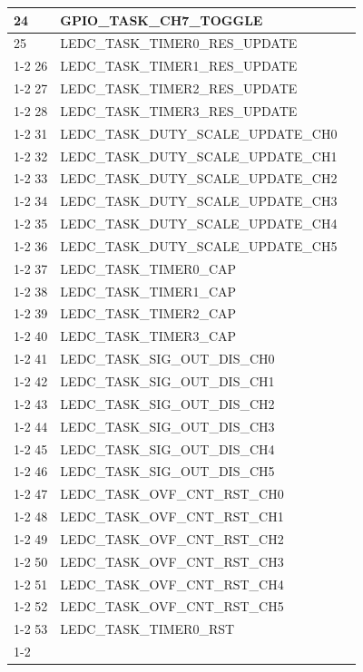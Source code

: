 \documentclass[main\_\_CN.tex]{subfiles}
\begin{document}
\begin{longtable}{ | l | l | l | }
24  & GPIO\_TASK\_CH7\_TOGGLE  &  \\ \hline
25  & LEDC\_TASK\_TIMER0\_RES\_UPDATE      & \nameref{mod:ledpwm} \\ \cline{1-2}
26  & LEDC\_TASK\_TIMER1\_RES\_UPDATE      & \\ \cline{1-2}
27  & LEDC\_TASK\_TIMER2\_RES\_UPDATE      & \\ \cline{1-2}
28  & LEDC\_TASK\_TIMER3\_RES\_UPDATE      & \\ \cline{1-2}
31  & LEDC\_TASK\_DUTY\_SCALE\_UPDATE\_CH0 & \\ \cline{1-2}
32  & LEDC\_TASK\_DUTY\_SCALE\_UPDATE\_CH1 & \\ \cline{1-2}
33  & LEDC\_TASK\_DUTY\_SCALE\_UPDATE\_CH2 & \\ \cline{1-2}
34  & LEDC\_TASK\_DUTY\_SCALE\_UPDATE\_CH3 & \\ \cline{1-2}
35  & LEDC\_TASK\_DUTY\_SCALE\_UPDATE\_CH4 & \\ \cline{1-2}
36  & LEDC\_TASK\_DUTY\_SCALE\_UPDATE\_CH5 & \\ \cline{1-2}
37  & LEDC\_TASK\_TIMER0\_CAP  & \\ \cline{1-2}
38  & LEDC\_TASK\_TIMER1\_CAP  & \\ \cline{1-2}
39  & LEDC\_TASK\_TIMER2\_CAP  & \\ \cline{1-2}
40  & LEDC\_TASK\_TIMER3\_CAP  & \\ \cline{1-2}
41  & LEDC\_TASK\_SIG\_OUT\_DIS\_CH0& \\ \cline{1-2}
42  & LEDC\_TASK\_SIG\_OUT\_DIS\_CH1& \\ \cline{1-2}
43  & LEDC\_TASK\_SIG\_OUT\_DIS\_CH2& \\ \cline{1-2}
44  & LEDC\_TASK\_SIG\_OUT\_DIS\_CH3& \\ \cline{1-2}
45  & LEDC\_TASK\_SIG\_OUT\_DIS\_CH4& \\ \cline{1-2}
46  & LEDC\_TASK\_SIG\_OUT\_DIS\_CH5& \\ \cline{1-2}
47  & LEDC\_TASK\_OVF\_CNT\_RST\_CH0& \\ \cline{1-2}
48  & LEDC\_TASK\_OVF\_CNT\_RST\_CH1& \\ \cline{1-2}
49  & LEDC\_TASK\_OVF\_CNT\_RST\_CH2& \\ \cline{1-2}
50  & LEDC\_TASK\_OVF\_CNT\_RST\_CH3& \\ \cline{1-2}
51  & LEDC\_TASK\_OVF\_CNT\_RST\_CH4& \\ \cline{1-2}
52  & LEDC\_TASK\_OVF\_CNT\_RST\_CH5& \\ \cline{1-2}
53  & LEDC\_TASK\_TIMER0\_RST  & \\ \cline{1-2}

\end{longtable}
\end{document}
